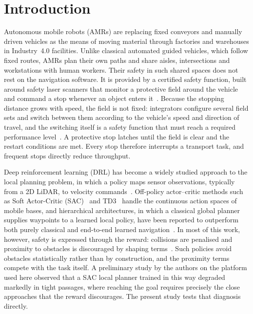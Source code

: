 \documentclass[sensors,article,submit,moreauthors]{Definitions/mdpi}
\begin{document}
\section{Introduction}

Autonomous mobile robots (AMRs) are replacing fixed conveyors and manually driven vehicles as the means of moving material through factories and warehouses in Industry~4.0 facilities. Unlike classical automated guided vehicles, which follow fixed routes, AMRs plan their own paths and share aisles, intersections and workstations with human workers. Their safety in such shared spaces does not rest on the navigation software. It is provided by a certified safety function, built around safety laser scanners that monitor a protective field around the vehicle and command a stop whenever an object enters it~\citep{iso3691-4,iec61496-3}. Because the stopping distance grows with speed, the field is not fixed: integrators configure several field sets and switch between them according to the vehicle's speed and direction of travel, and the switching itself is a safety function that must reach a required performance level~\citep{iso3691-4,iso13849-1}. A protective stop latches until the field is clear and the restart conditions are met. Every stop therefore interrupts a transport task, and frequent stops directly reduce throughput.

Deep reinforcement learning (DRL) has become a widely studied approach to the local planning problem, in which a policy maps sensor observations, typically from a 2D LiDAR, to velocity commands~\citep{le2024review,he2021review}. Off-policy actor--critic methods such as Soft Actor-Critic (SAC)~\citep{haarnoja2018sac} and TD3~\citep{fujimoto2018td3} handle the continuous action spaces of mobile bases, and hierarchical architectures, in which a classical global planner supplies waypoints to a learned local policy, have been reported to outperform both purely classical and end-to-end learned navigation~\citep{zhu2023hierarchical,kolomeytsev2025hybrid,zhao2025hierarchical}. In most of this work, however, safety is expressed through the reward: collisions are penalised and proximity to obstacles is discouraged by shaping terms~\citep{taheri2024ppo,cai2025agv}. Such policies avoid obstacles statistically rather than by construction, and the proximity terms compete with the task itself. A preliminary study by the authors on the platform used here observed that a SAC local planner trained in this way degraded markedly in tight passages, where reaching the goal requires precisely the close approaches that the reward discourages. The present study tests that diagnosis directly.
\end{document}
